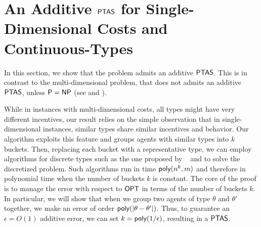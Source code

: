 \section{An Additive $\textsf{PTAS}$ for Single-Dimensional Costs and Continuous-Types}\label{sec:PTAS}

In this section, we show that the problem admits an additive $\textsf{PTAS}$. 
This is in contrast to the multi-dimensional problem, that does not admits an additive $\textsf{PTAS}$, unless $\textsf{P}=\textsf{NP}$ (see \cite{guruganesh2021contracts} and \cite[Theorem~7 for $\rho=1$,]{castiglioni2022bayesian}). 

While in instances with multi-dimensional costs, all types might have very different incentives, our result relies on the simple observation that in single-dimensional instances, similar types share similar incentives and behavior.
Our algorithm exploits this feature and groups agents with similar types into $k$ buckets.
Then, replacing each bucket with a representative type, we can employ algorithms for discrete types such as the one proposed by ~\citet{guruganesh2021contracts} and \citet{castiglioni2022bayesian} to solve the discretized problem. Such algorithms run in time $\textsf{poly}(n^k, m)$ and therefore in polynomial time when the number of buckets $k$ is constant.
%
The core of the proof is to manage the error with respect to $\textsf{OPT}$ in terms of the number of buckets $k$. In particular, we will show that when we group two agents of type $\theta$ and $\theta'$ together, we make an error of order $\textsf{poly}(|\theta-\theta'|)$. Thus, to guarantee an $\epsilon=O(1)$ additive error, we can set $k=\textsf{poly}(1/\epsilon)$, resulting in a $\textsf{PTAS}$.

